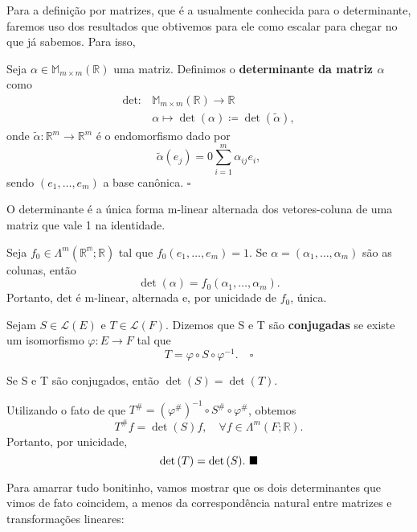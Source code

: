 \documentclass[../differential_forms.tex]{subfiles}
\begin{document}
Para a definição por matrizes, que é a usualmente conhecida para o determinante, faremos uso dos resultados que obtivemos para ele como escalar para chegar no que já sabemos. Para isso, 
\begin{def*}
  Seja \(\alpha \in \mathbb{M}_{m\times m}(\mathbb{R})\) uma matriz. Definimos o \textbf{determinante da matriz \(\alpha \)} como 
 \begin{align*}
     \mathrm{det}:&\mathbb{M}_{m\times m}(\mathbb{R})\rightarrow \mathbb{R} \\
        &\alpha \longmapsto \det{(\alpha )}\coloneqq \det{(\tilde{\alpha })},
 \end{align*}
        onde \(\tilde{\alpha }:\mathbb{R}^{m}\rightarrow \mathbb{R}^{m}\) é o endomorfismo dado por 
      \[
        \tilde{\alpha }(e_{j}) =0\sum\limits_{i=1}^{m}\alpha_{ij}e_{i},
      \]
      sendo \((e_1, \dotsc , e_{m})\) a base canônica. \(\square\)
\end{def*}
\begin{prop*}
  O determinante é a única forma m-linear alternada dos vetores-coluna de uma matriz que vale 1 na identidade.
\end{prop*}
\begin{proof*}
  Seja \(f_{0}\in \Lambda^{m}(\mathbb{R^{m}; \mathbb{R}})\) tal que \(f_{0}(e_1,\dotsc , e_{m})=1\). Se \(\alpha =(\alpha_1,\dotsc , \alpha_{m})\) são as colunas, então 
    \[
      \det{(\alpha )} = f_{0}(\alpha_1,\dotsc , \alpha_{m}). 
    \]
    Portanto, \(\mathrm{det}\) é m-linear, alternada e, por unicidade de \(f_{0}\), única. \qedsymbol
\end{proof*}
\begin{def*}
  Sejam \(S\in \mathcal{L}(E)\) e \(T\in \mathcal{L}(F)\). Dizemos que S e T são \textbf{conjugadas} se existe um isomorfismo \(\varphi :E\rightarrow F\) tal que 
    \[
      T= \varphi \circ S\circ \varphi^{-1}. \quad \square
    \]
\end{def*}
\begin{lemma*}
  Se S e T são conjugados, então \(\det{(S)} = \det{(T)}\).  
\end{lemma*}
\begin{proof*}
  Utilizando o fato de que \(T^{\#}= (\varphi^{\#})^{-1}\circ S^{\#}\circ \varphi^{\#}\), obtemos 
    \[
      T^{\#}f = \det{(S)}f,\quad \forall f\in \Lambda^{m}(F; \mathbb{R}).
    \]
    Portanto, por unicidade, 
      \[
        \det{(T)}=\det{(S)}.\text{ $\blacksquare$}
      \]
\end{proof*}
Para amarrar tudo bonitinho, vamos mostrar que os dois determinantes que vimos de fato coincidem, a menos da correspondência natural entre matrizes e transformações lineares:
\end{document}
